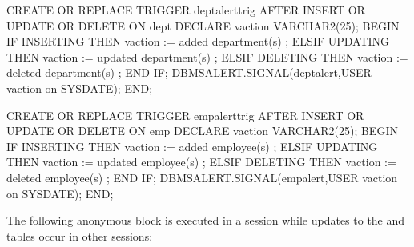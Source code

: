 \documentclass[letterpaper,10pt,english,openany,oneside]{sphinxmanual}
\begin{document}
%
\begin{sphinxVerbatim}[commandchars=\\\{\}]
CREATE OR REPLACE TRIGGER dept\PYGZus{}alert\PYGZus{}trig
   AFTER INSERT OR UPDATE OR DELETE ON dept
DECLARE
     v\PYGZus{}action        VARCHAR2(25);
BEGIN
   IF INSERTING THEN
       v\PYGZus{}action := \PYGZsq{} added department(s) \PYGZsq{};
   ELSIF UPDATING THEN
       v\PYGZus{}action := \PYGZsq{} updated department(s) \PYGZsq{};
   ELSIF DELETING THEN
       v\PYGZus{}action := \PYGZsq{} deleted department(s) \PYGZsq{};
   END IF;
   DBMS\PYGZus{}ALERT.SIGNAL(\PYGZsq{}dept\PYGZus{}alert\PYGZsq{},USER \textbar{}\textbar{} v\PYGZus{}action \textbar{}\textbar{} \PYGZsq{}on \PYGZsq{} \textbar{}\textbar{}
       SYSDATE);
END;

CREATE OR REPLACE TRIGGER emp\PYGZus{}alert\PYGZus{}trig
     AFTER INSERT OR UPDATE OR DELETE ON emp
DECLARE
     v\PYGZus{}action        VARCHAR2(25);
BEGIN
   IF INSERTING THEN
       v\PYGZus{}action := \PYGZsq{} added employee(s) \PYGZsq{};
   ELSIF UPDATING THEN
       v\PYGZus{}action := \PYGZsq{} updated employee(s) \PYGZsq{};
   ELSIF DELETING THEN
       v\PYGZus{}action := \PYGZsq{} deleted employee(s) \PYGZsq{};
   END IF;
   DBMS\PYGZus{}ALERT.SIGNAL(\PYGZsq{}emp\PYGZus{}alert\PYGZsq{},USER \textbar{}\textbar{} v\PYGZus{}action \textbar{}\textbar{} \PYGZsq{}on \PYGZsq{} \textbar{}\textbar{}
       SYSDATE);
END;
\end{sphinxVerbatim}

The following anonymous block is executed in a session while updates to the  and  tables occur in other sessions:
\end{document}

